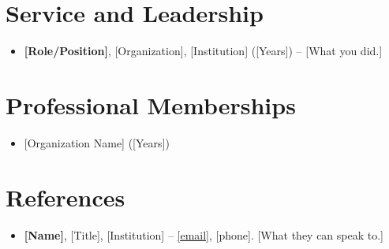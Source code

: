 \documentclass[11pt,letterpaper,sans]{moderncv}
\begin{document}

\section{Service and Leadership}
\vspace{1pt}
\begin{itemize}
\item{\textbf{[Role/Position]}, [Organization], [Institution] ([Years]) -- [What you did.]}
\end{itemize}


\section{Professional Memberships}
\vspace{1pt}
\begin{itemize}
\item{[Organization Name] ([Years])}
\end{itemize}


\section{References}
\vspace{1pt}
\begin{itemize}
\item{\textbf{[Name]}, [Title], [Institution] -- \href{mailto:[email]}{[email]}, [phone]. [What they can speak to.]}
\end{itemize}
\end{document}
